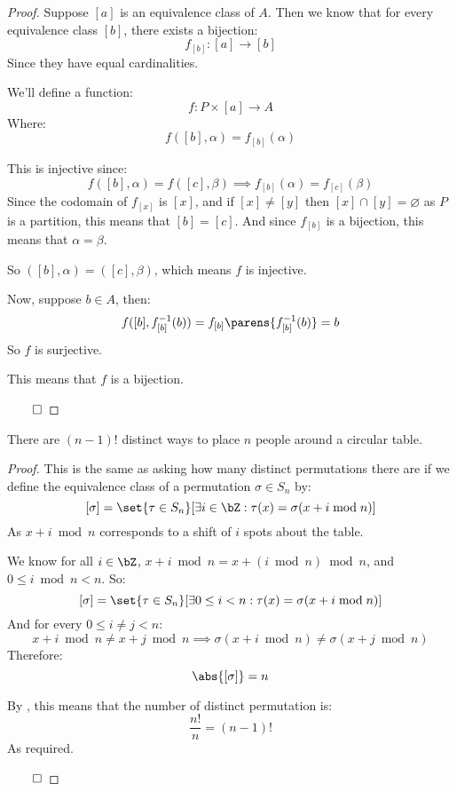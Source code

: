 \begin{proof}

	Suppose $[a]$ is an equivalence class of $A$. Then we know that for every equivalence class $[b]$, there exists a
	bijection:
	\[ f_{[b]}\colon [a]\longrightarrow[b] \]
	Since they have equal cardinalities.

	We'll define a function:
	\[ f\colon P\times[a]\longrightarrow A \]
	Where:
	\[ f([b], \alpha) = f_{[b]}(\alpha) \]

	This is injective since:
	\[ f([b], \alpha) = f([c], \beta) \implies f_{[b]}(\alpha) = f_{[c]}(\beta) \]
	Since the codomain of $f_{[x]}$ is $[x]$, and if $[x]\neq[y]$ then $[x]\cap[y]=\varnothing$ as $P$ is a partition, this
	means that $[b]=[c]$. And since $f_{[b]}$ is a bijection, this means that $\alpha=\beta$.

	So $([b],\alpha)=([c],\beta)$, which means $f$ is injective.
	
	Now, suppose $b\in A$, then:
	\[ f([b], f_{[b]}^{-1}(b)) = f_{[b]}\parens{f_{[b]}^{-1}(b)} = b \]
	So $f$ is surjective.

	This means that $f$ is a bijection.

\hfill$\qed$

\end{proof}

\begin{prop}

	There are $(n-1)!$ distinct ways to place $n$ people around a circular table.

\end{prop}

\begin{proof}

	This is the same as asking how many distinct permutations there are if we define the equivalence class of a permutation
	$\sigma\in S_n$ by:
	\[ [\sigma]=\set{\tau\in S_n}[\exists i\in\bZ: \tau(x)=\sigma(x+i\bmod n)] \]
	As $x+i\bmod n$ corresponds to a shift of $i$ spots about the table.

	We know for all $i\in\bZ$, $x+i\bmod n=x+(i\bmod n)\bmod n$, and $0\leq i\bmod n<n$. So:
	\[ [\sigma]=\set{\tau\in S_n}[\exists 0\leq i<n: \tau(x)=\sigma(x+i\bmod n)] \]
	And for every $0\leq i\neq j<n$:
	\[ x+i\bmod n\neq x+j\bmod n\implies \sigma(x+i\bmod n)\neq\sigma(x+j\bmod n) \]
	Therefore:
	\[ \abs{[\sigma]} = n \]

	By , this means that the number of distinct permutation is:
	\[ \frac{n!}{n} = (n-1)! \]
	As required.

\hfill$\qed$

\end{proof}

